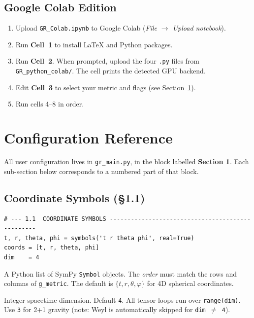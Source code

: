 \documentclass[11pt,a4paper]{article}
\newcommand{\code}[1]{\texttt{\small#1}}
\begin{document}
\subsection{Google Colab Edition}

\begin{enumerate}
  \item Upload \code{GR\_Colab.ipynb} to Google Colab
        (\emph{File $\to$ Upload notebook}).
  \item Run \textbf{Cell~1} to install LaTeX and Python packages.
  \item Run \textbf{Cell~2}.  When prompted, upload the four \code{.py} files
        from \code{GR\_python\_colab/}.  The cell prints the detected GPU
        backend.
  \item Edit \textbf{Cell~3} to select your metric and flags (see
        Section~\ref{sec:config}).
  \item Run cells 4--8 in order.
\end{enumerate}

\section{Configuration Reference}
\label{sec:config}

All user configuration lives in \code{gr\_main.py}, in the block labelled
\textbf{Section 1}.  Each sub-section below corresponds to a numbered part
of that block.

\subsection{Coordinate Symbols (\S1.1)}
\label{sec:cfg-coords}

\begin{lstlisting}
# --- 1.1  COORDINATE SYMBOLS -------------------------------------------------
t, r, theta, phi = symbols('t r theta phi', real=True)
coords = [t, r, theta, phi]
dim    = 4
\end{lstlisting}

\begin{description}[leftmargin=2cm,style=nextline]
  \item[\code{coords}]
    A Python list of SymPy \code{Symbol} objects.  The \emph{order} must
    match the rows and columns of \code{g\_metric}.  The default is
    $\{t, r, \theta, \varphi\}$ for 4D spherical coordinates.

  \item[\code{dim}]
    Integer spacetime dimension.  Default \code{4}.  All tensor loops run
    over \code{range(dim)}.  Use \code{3} for 2+1 gravity (note: Weyl is
    automatically skipped for \code{dim $\neq$ 4}).
\end{description}
\end{document}
